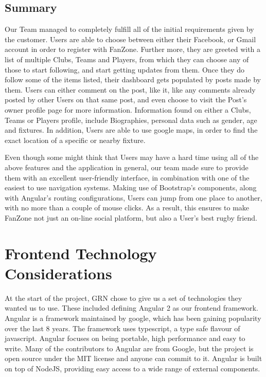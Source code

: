 \documentclass{l3proj}
\begin{document}
\subsection{Summary}
Our Team managed to completely fulfill all of the initial requirements given by the customer.
Users are able to choose between either their Facebook, or Gmail account in order
to register with FanZone. Further more, they are greeted with a list of multiple Clubs,
Teams and Players, from which they can choose any of those to start following, and start
getting updates from them. Once they do follow some of the items listed, their dashboard
gets populated by posts made by them. Users can either comment on the post, like it, like
any comments already posted by other Users on that same post, and even choose to visit
the Post's owner profile page for more information. Information found on either a Clubs, Teams
or Players profile, include Biographies, personal data such as gender, age and fixtures.
In addition, Users are able to use google maps, in order to find the exact location of
a specific or nearby fixture.

Even though some might think that Users may have a hard time using all of the above
features and the application in general, our team made sure to provide them with an
excellent user-friendly interface, in combination with one of the easiest to use
navigation systems. Making use of Bootstrap's components, along with Angular's routing
configurations, Users can jump from one place to another, with no more than a couple
of mouse clicks. As a result, this ensures to make FanZone not just an on-line
social platform, but also a User's best rugby friend.
\section{Frontend Technology Considerations} %
\label{sec:frontend}

At the start of the project, GRN chose to give us a set of technologies they
 wanted us to use. These included defining Angular 2 as our frontend framework.
 Angular is a framework maintained by google, which has been gaining popularity
 over the last 8 years\cite{angularjsoverview}. The framework uses typescript,
 a type safe flavour of javascript. Angular focuses on being portable, high performance
 and easy to write\cite{angular_features}. Many of the contributors to Angular are
 from Google, but the project is open source under the MIT license and anyone can
 commit to it\cite{angularjsoverview}. Angular is built on top of NodeJS, providing
 easy access to a wide range of external components.
\end{document}
